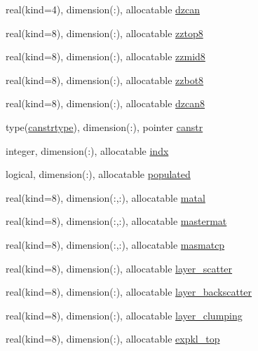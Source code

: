 \begin{DoxyCompactItemize}
\item 
real(kind=4), dimension(\+:), allocatable \hyperlink{namespacecanopy__layer__coms_ad1c041ca993f51ff5ea10ae260a4aa7c}{dzcan}
\item 
real(kind=8), dimension(\+:), allocatable \hyperlink{namespacecanopy__layer__coms_a365c61dc2bce371b5384ff2bbc4c2a9d}{zztop8}
\item 
real(kind=8), dimension(\+:), allocatable \hyperlink{namespacecanopy__layer__coms_a129061ed5b13a9746851e47fb6761d34}{zzmid8}
\item 
real(kind=8), dimension(\+:), allocatable \hyperlink{namespacecanopy__layer__coms_a7719283fbd377164b1912aaa64947f55}{zzbot8}
\item 
real(kind=8), dimension(\+:), allocatable \hyperlink{namespacecanopy__layer__coms_acb5c656adc50de1c62378239816dd7c8}{dzcan8}
\item 
type(\hyperlink{structcanopy__layer__coms_1_1canstrtype}{canstrtype}), dimension(\+:), pointer \hyperlink{namespacecanopy__layer__coms_a502cb30a5dce6c1049f734d995cf96b7}{canstr}
\item 
integer, dimension(\+:), allocatable \hyperlink{namespacecanopy__layer__coms_a05783dc93acf323347d52ae93a1b5857}{indx}
\item 
logical, dimension(\+:), allocatable \hyperlink{namespacecanopy__layer__coms_a3d5e7f8d5f502857b70216e005aebc74}{populated}
\item 
real(kind=8), dimension(\+:,\+:), allocatable \hyperlink{namespacecanopy__layer__coms_a4b24e2d8e68317659055ce1d96457a75}{matal}
\item 
real(kind=8), dimension(\+:,\+:), allocatable \hyperlink{namespacecanopy__layer__coms_aa115278bbf68142b924263dd467ad3e6}{mastermat}
\item 
real(kind=8), dimension(\+:,\+:), allocatable \hyperlink{namespacecanopy__layer__coms_a2953a9180b1d1c031bb78a840ae3ef74}{masmatcp}
\item 
real(kind=8), dimension(\+:), allocatable \hyperlink{namespacecanopy__layer__coms_a3c53cd13498b9f68d6bc94d7810845d3}{layer\+\_\+scatter}
\item 
real(kind=8), dimension(\+:), allocatable \hyperlink{namespacecanopy__layer__coms_a12455d67a7344d67667413f7a371ba7a}{layer\+\_\+backscatter}
\item 
real(kind=8), dimension(\+:), allocatable \hyperlink{namespacecanopy__layer__coms_a3bb08434b8bb97d6c0b52e6b39189730}{layer\+\_\+clumping}
\item 
real(kind=8), dimension(\+:), allocatable \hyperlink{namespacecanopy__layer__coms_a1759562df86795105d565baca407e299}{expkl\+\_\+top}

\end{DoxyCompactItemize}
